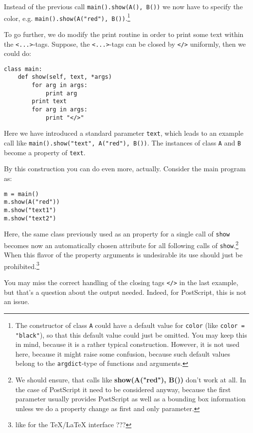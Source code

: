 \documentclass{article}
\begin{document}
Instead of the previous call \verb|main().show(A(), B())| we now have
to specify the color, e.g.
\verb|main().show(A("red"), B())|.\footnote{The constructor of class
\texttt{A} could have a default value for \texttt{color} (like
\texttt{color = "black"}), so that this default value could just be
omitted. You may keep this in mind, because it is a rather typical
construction. However, it is not used here, because it might raise
some confusion, because such default values belong to the
\texttt{argdict}-type of functions and arguments.}

To go further, we do modify the print routine in order to print some
text within the \verb|<...>|-tags. Suppose, the \verb|<...>|-tags can
be closed by \verb|</>| uniformly, then we could do:
\begin{verbatim}
class main:
    def show(self, text, *args)
        for arg in args:
            print arg
        print text
        for arg in args:
            print "</>"
\end{verbatim}

Here we have introduced a standard parameter \verb|text|, which leads
to an example call like \verb|main().show("text", A("red"), B())|. The
instances of class \verb|A| and \verb|B| become a property of
\verb|text|.

By this construction you can do even more, actually.
Consider the main program as:
\begin{verbatim}
m = main()
m.show(A("red"))
m.show("text1")
m.show("text2")
\end{verbatim}

Here, the same class previously used as an property for a single
call of \verb|show| becomes now an automatically chosen attribute for
all following calls of \verb|show|.\footnote{We should ensure, that
calls like \textbf{show(A("red"), B())} don't work at all. In the case
of PostScript it need to be considered anyway, because the first
parameter usually provides PostScript as well as a bounding box
information unless we do a property change as first and only
parameter.} When this flavor of the property arguments is undesirable
its use should just be prohibited.\footnote{like for the \TeX/\LaTeX{}
interface ???}

You may miss the correct handling of the closing tags \verb|</>| in
the last example, but that's a question about the output needed.
Indeed, for PostScript, this is not an issue.
\end{document}
